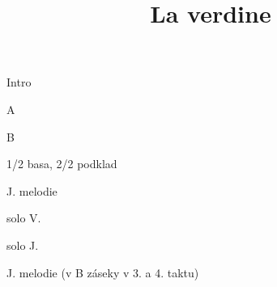 \documentclass[timestamp]{jazzgrid}
\title{La verdine}
\begin{document}
\maketitle
\begin{musicsection}{Intro}
\barline
	{}
	{}
	{}
	{}
\barline
	{}
	{}
	{}
	{}
\end{musicsection}
\begin{musicsection}{A}
\barline
	{}
	{}
	{}
	{}
\barline
	{}
	{}
	{}
	{}
	{}
	{}
	{}
	{}
\end{musicsection}
\begin{musicsection}{B}
\barline
	{}
	{}
	{}
	{}
\barline
	{}
	{}
	{}
	{}
\end{musicsection}

\footnotesize
\begin{description}[noitemsep,align=right,labelwidth=\widthof{\bfseries{AABA}}]
	\item [Intro] 1/2 basa, 2/2 podklad
	\item [AABA] J. melodie
	\item [AABA] solo V.
	\item [AABA] solo J.
	\item [AABA] J. melodie (v B záseky v 3. a 4. taktu)
\end{description}
\end{document}
